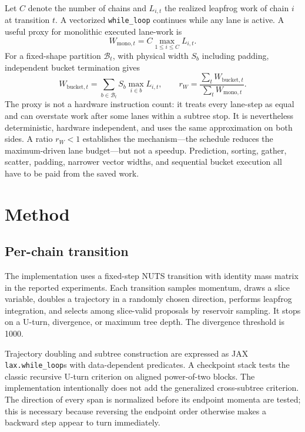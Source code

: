 \documentclass[conference]{IEEEtran}
\begin{document}
Let $C$ denote the number of chains and $L_{i,t}$ the realized leapfrog work of
chain $i$ at transition $t$.  A vectorized \texttt{while\_loop} continues while
any lane is active.  A useful proxy for monolithic executed lane-work is
\begin{equation}
  W_{\mathrm{mono},t}=C\max_{1\leq i\leq C}L_{i,t}.
  \label{eq:mono-work}
\end{equation}
For a fixed-shape partition $\mathcal{B}_t$, with physical width $S_b$ including
padding, independent bucket termination gives
\begin{equation}
  W_{\mathrm{bucket},t}=\sum_{b\in\mathcal{B}_t}
       S_b\max_{i\in b}L_{i,t},
  \qquad
  r_W=\frac{\sum_t W_{\mathrm{bucket},t}}
           {\sum_t W_{\mathrm{mono},t}}.
  \label{eq:bucket-work}
\end{equation}
The proxy is not a hardware instruction count: it treats every lane-step as
equal and can overstate work after some lanes within a subtree stop.  It is
nevertheless deterministic, hardware independent, and uses the same
approximation on both sides.  A ratio $r_W<1$ establishes the mechanism---the
schedule reduces the maximum-driven lane budget---but not a speedup.  Prediction,
sorting, gather, scatter, padding, narrower vector widths, and sequential bucket
execution all have to be paid from the saved work.

\section{Method}
\label{sec:method}

\subsection{Per-chain transition}

The implementation uses a fixed-step NUTS transition with identity mass matrix
in the reported experiments.  Each transition samples momentum, draws a slice
variable, doubles a trajectory in a randomly chosen direction, performs
leapfrog integration, and selects among slice-valid proposals by reservoir
sampling.  It stops on a U-turn, divergence, or maximum tree depth.  The
divergence threshold is 1000.

Trajectory doubling and subtree construction are expressed as JAX
\texttt{lax.while\_loop}s with data-dependent predicates.  A checkpoint stack
tests the classic recursive U-turn criterion on aligned power-of-two blocks.
The implementation intentionally does not add the generalized cross-subtree
criterion.  The direction of every span is normalized before its endpoint
momenta are tested; this is necessary because reversing the endpoint order
otherwise makes a backward step appear to turn immediately.
\end{document}
